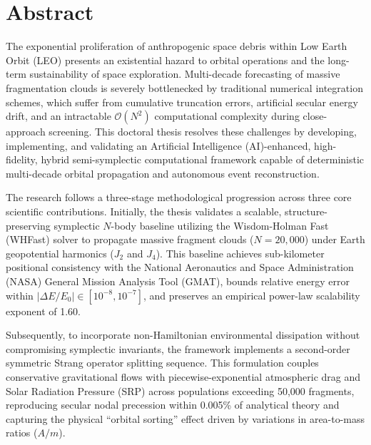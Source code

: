 \chapter*{Abstract}

The exponential proliferation of anthropogenic space debris within Low Earth Orbit (LEO) presents an existential hazard to orbital operations and the long-term sustainability of space exploration. Multi-decade forecasting of massive fragmentation clouds is severely bottlenecked by traditional numerical integration schemes, which suffer from cumulative truncation errors, artificial secular energy drift, and an intractable $\mathcal{O}(N^2)$ computational complexity during close-approach screening. This doctoral thesis resolves these challenges by developing, implementing, and validating an Artificial Intelligence (AI)-enhanced, high-fidelity, hybrid semi-symplectic computational framework capable of deterministic multi-decade orbital propagation and autonomous event reconstruction.

The research follows a three-stage methodological progression across three core scientific contributions. Initially, the thesis validates a scalable, structure-preserving symplectic $N$-body baseline utilizing the Wisdom-Holman Fast (WHFast) solver to propagate massive fragment clouds ($N = 20,000$) under Earth geopotential harmonics ($J_2$ and $J_4$). This baseline achieves sub-kilometer positional consistency with the National Aeronautics and Space Administration (NASA) General Mission Analysis Tool (GMAT), bounds relative energy error within $|\Delta E/E_0| \in [10^{-8}, 10^{-7}]$, and preserves an empirical power-law scalability exponent of 1.60. 

Subsequently, to incorporate non-Hamiltonian environmental dissipation without compromising symplectic invariants, the framework implements a second-order symmetric Strang operator splitting sequence. This formulation couples conservative gravitational flows with piecewise-exponential atmospheric drag and Solar Radiation Pressure (SRP) across populations exceeding 50,000 fragments, reproducing secular nodal precession within 0.005\% of analytical theory and capturing the physical ``orbital sorting'' effect driven by variations in area-to-mass ratios ($A/m$).

